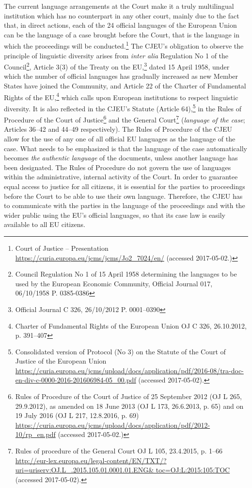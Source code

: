 \documentclass[output=paper]{langsci/langscibook}
\begin{document}
The current language arrangements at the Court make it a truly multilingual institution which has no counterpart in any other court, mainly due to the fact that, in direct actions, each of the 24 official languages of the European Union can be the language of a case brought before the Court, that is the language in which the proceedings will be conducted.\footnote{Court of Justice – Presentation \url{https://curia.europa.eu/jcms/jcms/Jo2_7024/en/}  (accessed 2017-05-02.)} The CJEU’s obligation to observe the principle of linguistic diversity arises from \textit{inter alia} Regulation No 1 of the Council\footnote{Council Regulation No 1 of 15 April 1958 determining the languages to be used by the European Economic Community, Official Journal 017, 06/10/1958 P. 0385-0386}, Article 3(3) of the Treaty on the EU,\footnote{Official Journal C 326, 26/10/2012 P. 0001–0390} dated 15 April 1958, under which the number of official languages has gradually increased as new Member States have joined the Community, and Article 22 of the Charter of Fundamental Rights of the EU,\footnote{Charter of Fundamental Rights of the European Union OJ C 326, 26.10.2012, p. 391–407} which calls upon European institutions to respect linguistic diversity. It is also reflected in the CJEU’s Statute (Article 64),\footnote{Consolidated version of Protocol (No 3) on the Statute of the Court of Justice of the European Union \url{https://curia.europa.eu/jcms/upload/docs/application/pdf/2016-08/tra-doc-en-div-c-0000-2016-201606984-05_00.pdf} (accessed 2017-05-02).} in the Rules of Procedure of the Court of Justice\footnote{Rules of Procedure of the Court of Justice of 25 September 2012 (OJ L 265, 29.9.2012), as amended on 18 June 2013 (OJ L 173, 26.6.2013, p. 65) and on 19 July 2016 (OJ L 217, 12.8.2016, p. 69) \url{https://curia.europa.eu/jcms/upload/docs/application/pdf/2012-10/rp_en.pdf} (accessed 2017-05-02.)} and the General Court\footnote{Rules of procedure of the General Court OJ L 105, 23.4.2015, p. 1–66 \url{http://eur-lex.europa.eu/legal-content/EN/TXT/?uri=uriserv:OJ.L_.2015.105.01.0001.01.ENG& toc=OJ:L:2015:105:TOC} (accessed 2017-05-02).} (\textit{language of the case}; Articles 36–42 and 44–49 respectively). The Rules of Procedure of the CJEU allow for the use of any one of all official EU languages as the language of the case. What needs to be emphasized is that the language of the case automatically becomes \textit{the} \textit{authentic language} of the documents, unless another language has been designated. The Rules of Procedure do not govern the use of languages within the administrative, internal activity of the Court. In order to guarantee equal access to justice for all citizens, it is essential for the parties to proceedings before the Court to be able to use their own language. Therefore, the CJEU has to communicate with the parties in the language of the proceedings and with the wider public using the EU’s official languages, so that its case law is easily available to all EU citizens.
\end{document}
